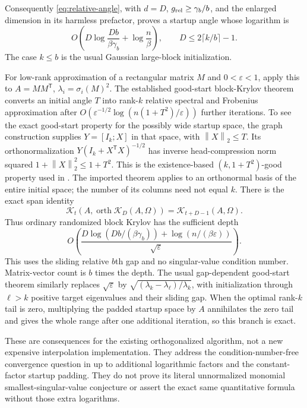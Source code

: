 \documentclass[11pt]{article}
\newcommand{\norm}[1]{\left\lVert#1\right\rVert}
\newcommand{\K}{\mathcal K}
\begin{document}
Consequently \eqref{eq:relative-angle}, with $d=D$,
$g_{\rm rel}\geq\gamma_b/b$, and the enlarged dimension in its harmless
prefactor, proves a startup angle whose logarithm is
\begin{equation}\label{eq:packed-log}
 O\left(D\log\frac{Db}{\beta\gamma_b}+\log\frac n\beta\right),
 \qquad D\leq2\lceil k/b\rceil-1.
\end{equation}
The case $k\leq b$ is the usual Gaussian large-block initialization.

For low-rank approximation of a rectangular matrix $M$ and
$0<\varepsilon<1$, apply this to
$A=MM^{\mathsf T}$, $\lambda_i=\sigma_i(M)^2$. The established
good-start block-Krylov theorem \cite{mmm,chen} converts an initial
angle $T$ into rank-$k$ relative spectral and Frobenius approximation
after $O(\varepsilon^{-1/2}\log(n(1+T^2)/\varepsilon))$ further
iterations. To see the exact good-start property for the possibly wide
startup space, the graph construction supplies $Y=[I_k;X]$ in that
space, with $\norm X_2\leq T$. Its orthonormalization
$Y(I_k+X^{\mathsf T}X)^{-1/2}$ has inverse head-compression norm squared
$1+\norm X_2^2\leq1+T^2$. This is the existence-based
$(k,1+T^2)$-good property used in \cite[Definition 3.1]{chen}.
The imported theorem applies to an orthonormal basis of the entire
initial space; the number of its columns need not equal $k$.
There is the exact span identity
\[
 \K_t(A,\operatorname{orth}\K_D(A,\Omega))
                         =\K_{t+D-1}(A,\Omega).
\]
Thus ordinary randomized block Krylov has the sufficient depth
\begin{equation}\label{eq:lra-depth}
 O\left(\frac{D\log(Db/(\beta\gamma_b))
                         +\log(n/(\beta\varepsilon))}{\sqrt\varepsilon}\right).
\end{equation}
This uses the sliding relative $b$th gap and no singular-value condition
number. Matrix-vector count is $b$ times the depth. The usual
gap-dependent good-start theorem similarly replaces $\sqrt\varepsilon$
by $\sqrt{(\lambda_k-\lambda_\ell)/\lambda_k}$, with initialization
through $\ell>k$ positive target eigenvalues and their sliding gap.
When the optimal rank-$k$ tail is zero, multiplying the padded startup
space by $A$ annihilates the zero tail and gives the whole range after
one additional iteration, so this branch is exact.

These are consequences for the existing orthogonalized algorithm, not a
new expensive interpolation implementation. They address the
condition-number-free convergence question in \cite[Section 5]{chen}
up to additional logarithmic factors and the constant-factor startup
padding. They do not prove its literal unnormalized monomial
smallest-singular-value conjecture or assert the exact same quantitative
formula without those extra logarithms.
\end{document}
